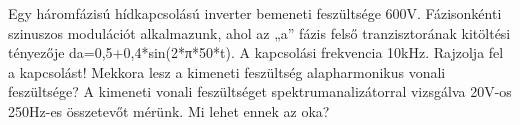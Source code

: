 \begin{example}

Egy háromfázisú hídkapcsolású inverter bemeneti feszültsége 600V. Fázisonkénti szinuszos modulációt alkalmazunk, ahol az „a” fázis felső tranzisztorának kitöltési tényezője da=0,5+0,4*sin(2*π*50*t). A kapcsolási frekvencia 10kHz. Rajzolja fel a kapcsolást! Mekkora lesz a kimeneti feszültség alapharmonikus vonali feszültsége? A kimeneti vonali feszültséget spektrumanalizátorral vizsgálva 20V-os 250Hz-es összetevőt mérünk. Mi lehet ennek az oka?

\tcbline
\vspace{1mm}

\solution

\end{example}
